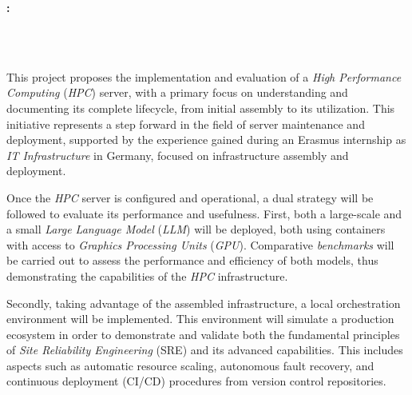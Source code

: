 \cleardoublepage


\thispagestyle{empty}


\begin{center}
{\large\bfseries \myTitleE: \mySubTitleE}\\
\end{center}
\begin{center}
\myName\\
\end{center}


\vspace{0.7cm}
\\

This project proposes the implementation and evaluation of a \textit{High Performance Computing} (\textit{HPC}) server, with a primary focus on understanding and documenting its complete lifecycle, from initial assembly to its utilization. This initiative represents a step forward in the field of server maintenance and deployment, supported by the experience gained during an Erasmus internship as \textit{IT Infrastructure} in Germany, focused on infrastructure assembly and deployment.

Once the \textit{HPC} server is configured and operational, a dual strategy will be followed to evaluate its performance and usefulness. First, both a large-scale and a small \textit{Large Language Model} (\textit{LLM}) will be deployed, both using containers with access to \textit{Graphics Processing Units} (\textit{GPU}). Comparative \textit{benchmarks} will be carried out to assess the performance and efficiency of both models, thus demonstrating the capabilities of the \textit{HPC} infrastructure.

Secondly, taking advantage of the assembled infrastructure, a local orchestration environment will be implemented. This environment will simulate a production ecosystem in order to demonstrate and validate both the fundamental principles of \textit{Site Reliability Engineering} (SRE) and its advanced capabilities. This includes aspects such as automatic resource scaling, autonomous fault recovery, and continuous deployment (CI/CD) procedures from version control repositories.


